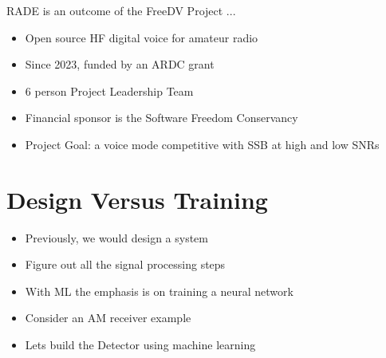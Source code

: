 \documentclass{beamer}
\begin{document}
\begin{frame}
RADE is an outcome of the FreeDV Project ...
\begin{itemize}
    \item Open source HF digital voice for amateur radio
    \item Since 2023, funded by an ARDC grant
    \item 6 person Project Leadership Team
    \item Financial sponsor is the Software Freedom Conservancy
    \item Project Goal: a voice mode competitive with SSB at high and low SNRs
\end{itemize}
\end{frame}

\section{Design Versus Training}

\begin{frame}

\begin{itemize}
	\item Previously, we would design a system
	\item Figure out all the signal processing steps
	\item With ML the emphasis is on training a neural network
	\item Consider an AM receiver example
	\item Lets build the Detector using machine learning
\end{itemize}


\end{frame}
\end{document}
